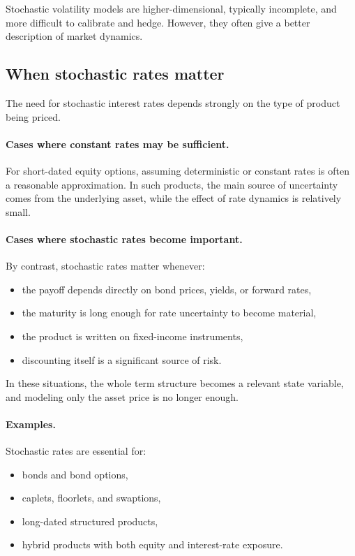 \documentclass[11pt]{article}
\theoremstyle{plain}
\theoremstyle{definition}
\theoremstyle{remark}
\begin{document}
Stochastic volatility models are higher-dimensional, typically
incomplete, and more difficult to calibrate and hedge.
However, they often give a better description of market dynamics.

\subsection{When stochastic rates matter}

The need for stochastic interest rates depends strongly on the type of
product being priced.

\paragraph{Cases where constant rates may be sufficient.}
For short-dated equity options, assuming deterministic or constant rates
is often a reasonable approximation.
In such products, the main source of uncertainty comes from the
underlying asset, while the effect of rate dynamics is relatively small.

\paragraph{Cases where stochastic rates become important.}
By contrast, stochastic rates matter whenever:
\begin{itemize}[leftmargin=1.4em]
    \item the payoff depends directly on bond prices, yields, or forward
    rates,
    \item the maturity is long enough for rate uncertainty to become
    material,
    \item the product is written on fixed-income instruments,
    \item discounting itself is a significant source of risk.
\end{itemize}

In these situations, the whole term structure becomes a relevant
state variable, and modeling only the asset price is no longer enough.

\paragraph{Examples.}
Stochastic rates are essential for:
\begin{itemize}[leftmargin=1.4em]
    \item bonds and bond options,
    \item caplets, floorlets, and swaptions,
    \item long-dated structured products,
    \item hybrid products with both equity and interest-rate exposure.
\end{itemize}
\end{document}
